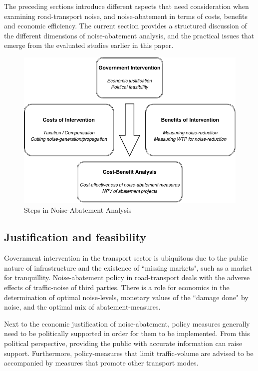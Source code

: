 \documentclass[a4paper]{scrartcl}
\begin{document}
The preceding sections introduce different aspects that need consideration when examining road-transport noise, and noise-abatement in terms of costs, benefits and economic efficiency. The current section provides a structured discussion of the different dimensions of noise-abatement analysis, and the practical issues that emerge from the evaluated studies earlier in this paper. 

\begin{figure}[h]
	\caption{Steps in Noise-Abatement Analysis}
	\centering
	\includegraphics[width=\textwidth]{Graph1}
\end{figure}

\subsection{Justification and feasibility}

Government intervention in the transport sector is ubiquitous due to the public nature of infrastructure and the existence of ``missing markets", such as a market for tranquillity. Noise-abatement policy in road-transport deals with the adverse effects of traffic-noise of third parties. There is a role for economics in the determination of  optimal noise-levels, monetary values of the ``damage done" by noise, and the optimal mix of abatement-measures. 

Next to the economic justification of noise-abatement, policy measures generally need to be politically supported in order for them to be implemented. From this political perspective, providing the public with accurate information can raise support. Furthermore, policy-measures that limit traffic-volume are advised to be accompanied by measures that promote other transport modes.
\end{document}
